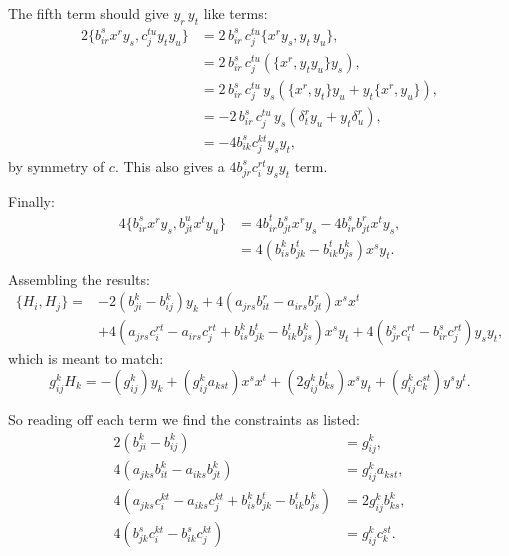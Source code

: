     The fifth term should give \(y_r\, y_t\) like terms:
    \begin{align*}
        2 \{ b_{ir}^s x^r y_s , c_{j}^{t u} y_t y_u \} &= 2 \,b_{ir}^s \,c_j^{tu} \{ x^r y_s , y_t \,y_u\} ,\\
                                                       &= 2 \,b_{ir}^s \,c_j^{tu} \left( \{ x^r, y_t y_u \} y_s \right) ,\\
                                                       &= 2 \,b_{ir}^s \,c_j^{tu} \, y_s \left( \{ x^r, y_t \} y_u + y_t \{ x^r , y_u \} \right) ,\\
                                                       &= -2 \,b_{ir}^s \,c_j^{tu} \, y_s \left( \delta^r_t y_u + y_t \delta^r_u \right) ,\\
                                                       &= -4 b_{ik}^s c_j^{kt} y_s y_t,
    \end{align*}
    by symmetry of \(c\). This also gives a \(4 b_{jr}^s c_i^{rt} y_s y_t\) term.
    
    Finally:
    \begin{align*}
        4 \{ b_{ir}^s x^r y_s ,b_{jt}^u x^t y_u\}& = 4 b_{ir}^t b_{jt}^s x^r y_s - 4 b_{ir}^s b_{jt}^r x^t y_s, \\
                                                 &= 4 \left(   b_{is}^k b_{jk}^t  - b_{ik}^t b_{js}^k \right) x^s y_t. \\
    \end{align*}
    Assembling the results:
    \begin{align*} \{H_i, H_j\} =& - 2\left(  b_{ji}^k - b_{ij}^k \right) y_k  +  4 \left(  a_{jrs} b_{it}^r -  a_{irs} b_{jt}^r  \right)x^s x^t \\
                                &+ 4\left( a_{jrs} c_i^{r t} -  a_{irs} c_j^{r t} +   b_{is}^k b_{jk}^t  -  b_{ik}^t b_{js}^k \right) x^s y_t + 4 \left(  b_{jr}^s c_i^{rt}  - b_{ir}^s c_j^{rt} \right) y_s y_t,  
    \end{align*}
    which is meant to match: 
    \[ g_{ij}^k H_k = - \left( g_{ij}^k  \right) y_k + \left( g_{ij}^k  a_{kst} \right) x^s x^t + \left( 2 g_{ij}^k b_{k s }^t \right) x^s y_t + \left( g_{ij}^k c_k^{st}\right) y^s y^t. \]
    
    So reading off each term we find the constraints as listed:
    \begin{align*}
       2 \left(  b_{ji}^k - b_{ij}^k \right) &= g_{ij}^k,\\
       4\left( a_{jks} b_{it}^k -  a_{iks} b_{jt}^k \right) &=  g_{ij}^k  a_{kst}, \\
       4\left(  a_{jks} c_i^{k t} -  a_{ik s} c_j^{k t} +  b_{is}^k b_{jk}^t  -  b_{ik}^t b_{js}^k \right) & = 2 g_{ij}^k b_{ k s}^k, \\ 
       4 \left( b_{jk}^s c_i^{kt}  - b_{ik}^s c_j^{kt}\right) &= g_{ij}^k c_k^{st}.
    \end{align*}
    
